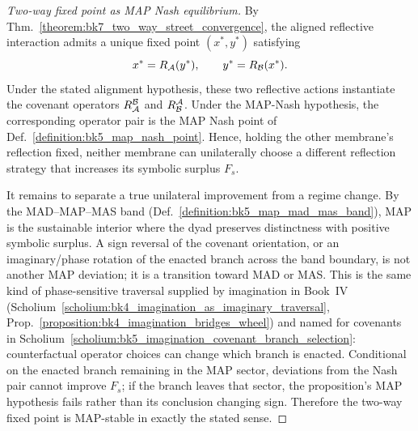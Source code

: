 \begin{proof}[Two-way fixed point as MAP Nash equilibrium]
\label{proof:bk7_map_compatible_reciprocity}
\leavevmode
By Thm.~\ref{theorem:bk7_two_way_street_convergence}, the aligned reflective interaction admits a unique fixed point \((x^*,y^*)\) satisfying
\[
x^*=R_{\mathcal{A}}(y^*),
\qquad
y^*=R_{\mathcal{B}}(x^*).
\]
Under the stated alignment hypothesis, these two reflective actions instantiate the covenant operators \(R^{\mathcal{B}}_{\mathcal{A}}\) and \(R^{\mathcal{A}}_{\mathcal{B}}\). Under the MAP-Nash hypothesis, the corresponding operator pair is the MAP Nash point of Def.~\ref{definition:bk5_map_nash_point}. Hence, holding the other membrane's reflection fixed, neither membrane can unilaterally choose a different reflection strategy that increases its symbolic surplus \(F_s\).

It remains to separate a true unilateral improvement from a regime change. By the MAD--MAP--MAS band (Def.~\ref{definition:bk5_map_mad_mas_band}), MAP is the sustainable interior where the dyad preserves distinctness with positive symbolic surplus. A sign reversal of the covenant orientation, or an imaginary/phase rotation of the enacted branch across the band boundary, is not another MAP deviation; it is a transition toward MAD or MAS. This is the same kind of phase-sensitive traversal supplied by imagination in Book~IV (Scholium~\ref{scholium:bk4_imagination_as_imaginary_traversal}, Prop.~\ref{proposition:bk4_imagination_bridges_wheel}) and named for covenants in Scholium~\ref{scholium:bk5_imagination_covenant_branch_selection}: counterfactual operator choices can change which branch is enacted. Conditional on the enacted branch remaining in the MAP sector, deviations from the Nash pair cannot improve \(F_s\); if the branch leaves that sector, the proposition's MAP hypothesis fails rather than its conclusion changing sign. Therefore the two-way fixed point is MAP-stable in exactly the stated sense.
\end{proof}
